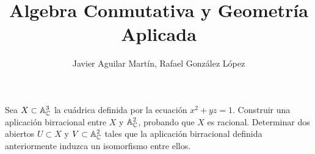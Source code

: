 \documentclass[twoside]{article}
\begin{document}
\title{Algebra Conmutativa y Geometría Aplicada}
\author{Javier Aguilar Martín, Rafael González López}
\maketitle
\begin{ejercicio}{2} Sea $X\subset \mathbb{A}^3_{\mathbb{C}}$ la cuádrica definida por la ecuación $x^2 + yz =1$. Construir una aplicación birracional entre $X$ y $\mathbb{A}^2_{\mathbb{C}}$, probando que $X$ es racional. Determinar dos abiertos $U\subset X$ y $V\subset \mathbb{A}^2_{\mathbb{C}}$ tales que la aplicación birracional definida anteriormente induzca un isomorfismo entre ellos.
\end{ejercicio}
\begin{solucion}
\end{solucion}
\newpage 
\end{document}
